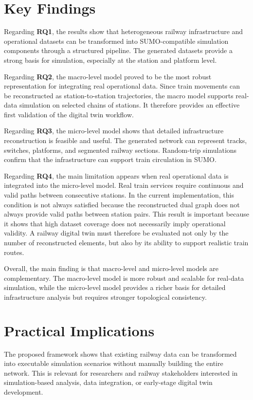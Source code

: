 \section{Key Findings}
Regarding \textbf{RQ1}, the results show that heterogeneous railway infrastructure and operational datasets can be 
transformed into SUMO-compatible simulation components through a structured pipeline. The generated datasets provide a 
strong basis for simulation, especially at the station and platform level.

Regarding \textbf{RQ2}, the macro-level model proved to be the most robust representation for integrating real operational 
data. Since train movements can be reconstructed as station-to-station trajectories, the macro model supports real-data 
simulation on selected chains of stations. It therefore provides an effective first validation of the digital twin 
workflow.

Regarding \textbf{RQ3}, the micro-level model shows that detailed infrastructure reconstruction is feasible and useful. The 
generated network can represent tracks, switches, platforms, and segmented railway sections. Random-trip simulations 
confirm that the infrastructure can support train circulation in SUMO.\@

Regarding \textbf{RQ4}, the main limitation appears when real operational data is integrated into the micro-level model. 
Real train services require continuous and valid paths between consecutive stations. In the current implementation, this 
condition is not always satisfied because the reconstructed dual graph does not always provide valid paths between station 
pairs. This result is important because it shows that high dataset coverage does not necessarily imply operational 
validity. A railway digital twin must therefore be evaluated not only by the number of reconstructed elements, but also by 
its ability to support realistic train routes.

Overall, the main finding is that macro-level and micro-level models are complementary. The macro-level model is more 
robust and scalable for real-data simulation, while the micro-level model provides a richer basis for detailed 
infrastructure analysis but requires stronger topological consistency.

\section{Practical Implications}
The proposed framework shows that existing railway data can be transformed into executable simulation scenarios without 
manually building the entire network. This is relevant for researchers and railway stakeholders interested in 
simulation-based analysis, data integration, or early-stage digital twin development.

